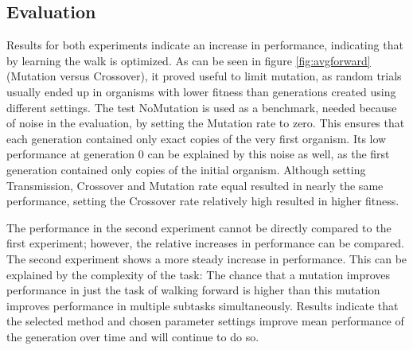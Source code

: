 \documentclass{article}
\begin{document}
\subsection{Evaluation}
Results for both experiments indicate an increase in performance, indicating that by learning the walk is optimized. As can be seen in figure \ref{fig:avgforward} (Mutation versus Crossover), it proved useful to limit mutation, as random trials usually ended up in organisms with lower fitness than generations created using different settings. The test NoMutation is used as a benchmark, needed because of noise in the evaluation, by setting the Mutation rate to zero. This ensures that each generation contained only exact copies of the very first organism. Its low performance at generation 0 can be explained by this noise as well, as the first generation contained only copies of the initial organism. Although setting Transmission, Crossover and Mutation rate equal resulted in nearly the same performance, setting the Crossover rate relatively high resulted in higher fitness. 

The performance in the second experiment cannot be directly compared to the first experiment; however, the relative increases in performance can be compared. 
The second experiment shows a more steady increase in performance. This can be explained by the complexity of the task: 
The chance that a mutation improves performance in just the task of walking forward is higher than this mutation improves performance in multiple subtasks simultaneously.
Results indicate that the selected method and chosen parameter settings improve mean performance of the generation over time and will continue to do so. 
\end{document}
